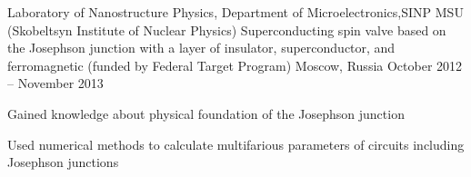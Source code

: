 \begin{cventries}
	\cventry
		{
			Laboratory of Nanostructure Physics, Department of Microelectronics,\linebreak SINP MSU (Skobeltsyn Institute of Nuclear Physics)
		}
		{
			Superconducting spin valve based on the Josephson junction with a layer of insulator, superconductor, and ferromagnetic (funded by Federal Target Program)
		}
		{Moscow, Russia}
		{October 2012 -- November 2013}
		{
			\begin{cvitems}
				\item {Gained knowledge about physical foundation of the Josephson junction}
				\item {Used numerical methods to calculate multifarious parameters of circuits including Josephson junctions}
			\end{cvitems}
		}
		
\end{cventries}
